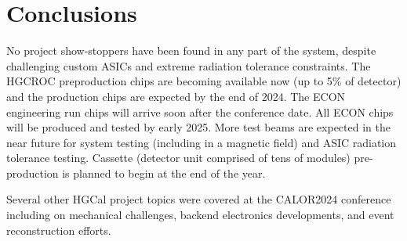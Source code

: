 \documentclass[twocolumn]{webofc}
\begin{document}
\section{Conclusions}
\label{sec:conclusion}
No project show-stoppers have been found in any part of the system, despite challenging custom ASICs and extreme radiation tolerance constraints.
The HGCROC preproduction chips are becoming available now (up to 5\% of detector) and the production chips are expected by the end of 2024. The ECON engineering run chips will arrive soon after the conference date. All ECON chips will be produced and tested by early 2025.
More test beams are expected in the near future for system testing (including in a magnetic field) and ASIC radiation tolerance testing.
Cassette (detector unit comprised of tens of modules) pre-production is planned to begin at the end of the year.

Several other HGCal project topics were covered at the CALOR2024 conference including on mechanical challenges, backend electronics developments, and event reconstruction efforts.
\end{document}
